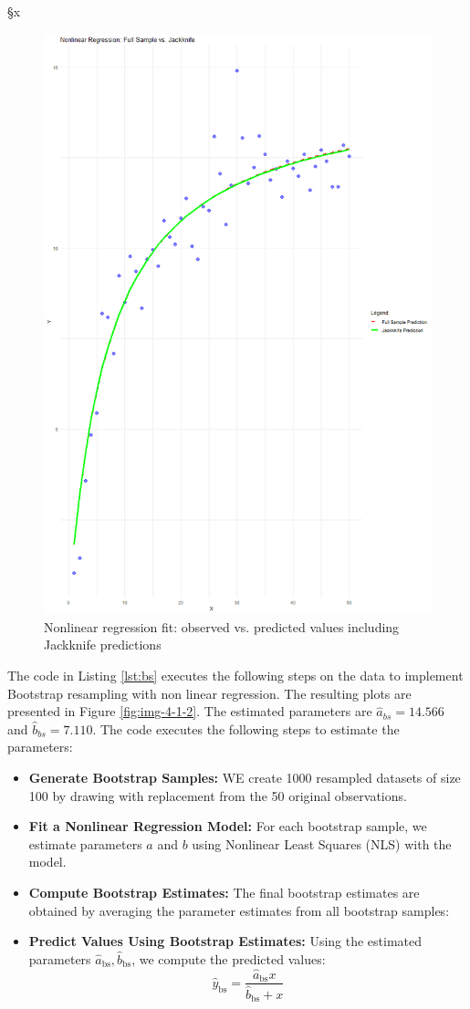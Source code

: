 §x\documentclass[]{article}
\begin{document}
\begin{figure}[H]
	\centering
	\includegraphics[width=0.7\linewidth]{img/img-4-1-1}
	\caption{Nonlinear regression fit: observed vs. predicted values including Jackknife predictions}
	\label{fig:img-4-1-1}
\end{figure}


The code in Listing \ref{lst:bs} executes the following steps on the data to implement Bootstrap resampling with non linear regression. The resulting plots are presented in Figure \ref{fig:img-4-1-2}. The estimated parameters are $\hat{a}_{bs} = 14.566$ and $\hat{b}_{bs} = 7.110$. The code executes the following steps to estimate the parameters:

\begin{itemize}
	\item \textbf{Generate Bootstrap Samples:}  
	WE create 1000 resampled datasets of size 100 by drawing with replacement from the 50 original observations.
	
	\item \textbf{Fit a Nonlinear Regression Model:}  
	For each bootstrap sample, we estimate parameters $a$ and $b$ using Nonlinear Least Squares (NLS) with the model.
	
	\item \textbf{Compute Bootstrap Estimates:}  
	The final bootstrap estimates are obtained by averaging the parameter estimates from all bootstrap samples:

	\item \textbf{Predict Values Using Bootstrap Estimates:}  
	Using the estimated parameters $\hat{a}_{\text{bs}}, \hat{b}_{\text{bs}}$, we compute the predicted values:
	\begin{equation}
		\hat{y}_{\text{bs}} = \frac{\hat{a}_{\text{bs}} x}{\hat{b}_{\text{bs}} + x}
	\end{equation}
	
\end{itemize}
\end{document}
